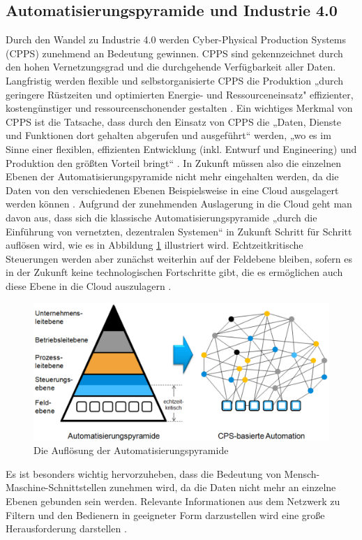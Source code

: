 \subsection{Automatisierungspyramide und Industrie 4.0}\label{sec:AutomatisierungspyramideUndIndustrie4.0}
Durch den Wandel zu Industrie 4.0 werden Cyber-Physical Production Systems (CPPS) zunehmend an Bedeutung gewinnen. CPPS sind gekennzeichnet durch den hohen Vernetzungsgrad und die durchgehende Verfügbarkeit aller Daten. Langfristig werden flexible und selbstorganisierte CPPS die Produktion „durch geringere Rüstzeiten und optimierten Energie- und Ressourceneinsatz" \cite[S.3]{17} effizienter, kostengünstiger und ressourcenschonender gestalten \cite[S.3]{17}.
\newline\newline
Ein wichtiges Merkmal von CPPS ist die Tatsache, dass durch den Einsatz von CPPS die „Daten, Dienste und Funktionen dort gehalten abgerufen und ausgeführt“ \cite[S.4]{17} werden, „wo es im Sinne einer flexiblen, effizienten Entwicklung (inkl. Entwurf und Engineering) und Produktion den größten Vorteil bringt“ \cite[S.4]{17}. In Zukunft müssen also die einzelnen Ebenen der Automatisierungspyramide nicht mehr eingehalten werden, da die Daten von den verschiedenen Ebenen Beispielsweise in eine Cloud ausgelagert werden können \cite[S.4]{17}.
\newline\newline
Aufgrund der zunehmenden Auslagerung in die Cloud geht man davon aus, dass sich die klassische Automatisierungspyramide „durch die Einführung von vernetzten, dezentralen Systemen“ \cite[S.4]{17} in Zukunft Schritt für Schritt auflösen wird, wie es in Abbildung \ref{fig:AutomatisierungspyramideCPPS} illustriert wird. Echtzeitkritische Steuerungen werden aber zunächst weiterhin auf der Feldebene bleiben, sofern es in der Zukunft keine technologischen Fortschritte gibt, die es ermöglichen auch diese Ebene in die Cloud auszulagern \cite[S.4]{17}.
\begin{figure}[h]
	\centering
	\includegraphics[width=1\linewidth]{Bilder/A10_AutomatisierungspyramideCPPS}
	\caption{Die Auflösung der Automatisierungspyramide \cite[S.4]{17}}
	\label{fig:AutomatisierungspyramideCPPS}
\end{figure}
\newline
\noindent Es ist besonders wichtig hervorzuheben, dass die Bedeutung von Mensch-Maschine-Schnittstellen zunehmen wird, da die Daten nicht mehr an einzelne Ebenen gebunden sein werden. Relevante Informationen aus dem Netzwerk zu Filtern und den Bedienern in geeigneter Form darzustellen wird eine große Herausforderung darstellen \cite[S.4]{17}.

